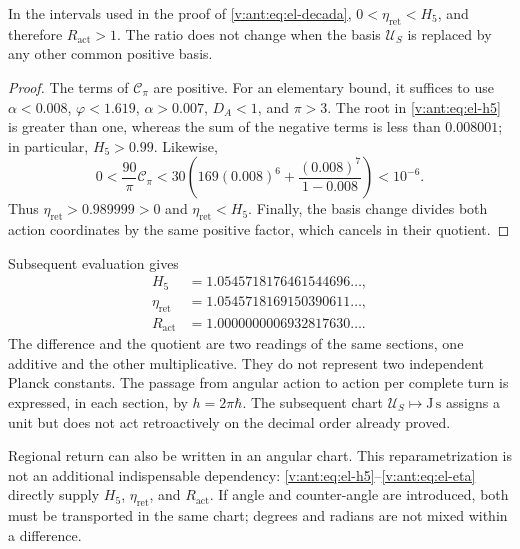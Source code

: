 \begin{proposition}
In the intervals used in the proof of \eqref{v:ant:eq:el-decada},
\(0<\eta_{\mathrm{ret}}<H_5\), and therefore
\(R_{\mathrm{act}}>1\). The ratio does not change when the basis
\(\mathcal U_S\) is replaced by any other common positive basis.
\end{proposition}
\begin{proof}
The terms of \(\mathcal C_\pi\) are positive. For an elementary
bound, it suffices to use \(\alpha<0.008\), \(\varphi<1.619\),
\(\alpha>0.007\), \(D_A<1\), and \(\pi>3\). The root in
\eqref{v:ant:eq:el-h5} is greater than one, whereas the sum of the negative
terms is less than \(0.008001\); in particular, \(H_5>0.99\).
Likewise,
\[
 0<\frac{90}{\pi}\mathcal C_\pi
 <30\left(169(0.008)^6+
           \frac{(0.008)^7}{1-0.008}\right)<10^{-6}.
\]
Thus \(\eta_{\mathrm{ret}}>0.989999>0\) and
\(\eta_{\mathrm{ret}}<H_5\). Finally, the basis change divides
both action coordinates by the same positive factor, which cancels in
their quotient.
\end{proof}

Subsequent evaluation gives
\begin{align*}
 H_5&=1.0545718176461544696\ldots,\\
 \eta_{\mathrm{ret}}&=1.0545718169150390611\ldots,\\
 R_{\mathrm{act}}&=1.0000000006932817630\ldots.
\end{align*}
The difference and the quotient are two readings of the same sections,
one additive and the other multiplicative. They do not represent two independent
Planck constants. The passage from angular action to action per complete
turn is expressed, in each section, by
\(h=2\pi\hbar\). The subsequent chart
\(\mathcal U_S\mapsto\mathrm{J\,s}\) assigns a unit but does not
act retroactively on the decimal order already proved.

Regional return can also be written in an angular chart.
This reparametrization is not an additional indispensable dependency:
\eqref{v:ant:eq:el-h5}--\eqref{v:ant:eq:el-eta} directly supply
\(H_5\), \(\eta_{\mathrm{ret}}\), and \(R_{\mathrm{act}}\). If
angle and counter-angle are introduced, both must be transported in the same
chart; degrees and radians are not mixed within a difference.


